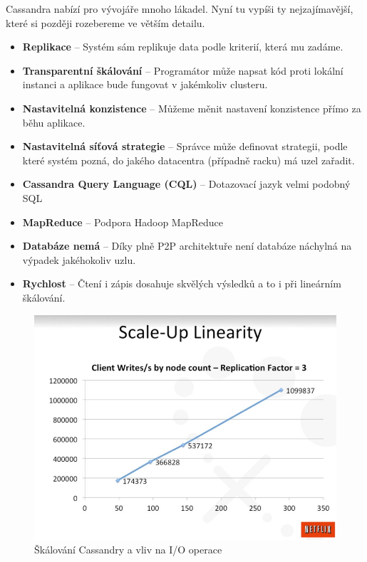 Cassandra nabízí pro vývojáře mnoho lákadel. Nyní tu vypíši ty nejzajímavější, které si později rozebereme ve větším detailu. 

\begin{itemize}
\item \textbf{Replikace} – Systém sám replikuje data podle kriterií, která mu zadáme.
\item \textbf{Transparentní škálování} – Programátor může napsat kód proti lokální instanci a aplikace bude fungovat v jakémkoliv clusteru.
\item \textbf{Nastavitelná konzistence} – Můžeme měnit nastavení konzistence přímo za běhu aplikace.
\item \textbf{Nastavitelná síťová strategie} – Správce může definovat strategii, podle které systém pozná, do jakého datacentra (případně racku) má uzel zařadit.
\item \textbf{Cassandra Query Language (CQL)} – Dotazovací jazyk velmi podobný SQL
\item \textbf{MapReduce} – Podpora Hadoop MapReduce
\item \textbf{Databáze nemá } – Díky plně P2P architektuře není databáze náchylná na výpadek jakéhokoliv uzlu.
\item \textbf{Rychlost} – Čtení i zápis dosahuje skvělých výsledků \cite{benchmark} a to i při lineárním škálování. 
\end{itemize} 

\begin{figure}[h]
\centering
\includegraphics[scale=0.5]{images/netflix}
\caption{Škálování Cassandry a vliv na I/O operace}
\label{fig:scaleup}
\end{figure}

